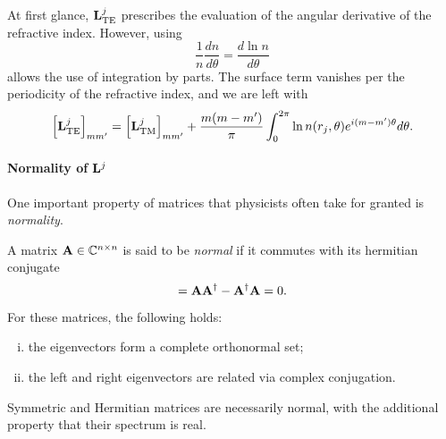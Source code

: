 At first glance, $\mathbf{L}^j_\text{TE}$ prescribes the evaluation of
the angular derivative of the refractive index. However, 
using 
	\begin{equation}
		\frac{1}{n}\frac{dn}{d\theta} = \frac{d\ln n}{d\theta}
	\end{equation}
allows the use of integration by parts. The surface term 
vanishes per the periodicity of the refractive index, and we 
are left with 
	\begin{equation}
		\left[\mathbf{L}^j_\text{TE}\right]_{mm'} = \left[\mathbf{L}^j_\text{TM}\right]_{mm'}
						+\frac{m(m-m')}{\pi}\int_0^{2\pi}\ln n(r_j,\theta) e^{i(m-m')\theta}d\theta.
	\end{equation}

\paragraph{Normality of $\mathbf{L}^j$}
One important property of matrices that physicists often 
take for granted is \textit{normality}.

\begin{defn}
	A matrix $\mathbf{A}\in\mathbb{C}^{n\times n}$ is said to be \textit{normal}
	if it commutes with its hermitian conjugate
		\begin{equation}
			[\mat{A},\mat{A}^\dagger]=\mat{A}\mat{A}^\dagger-\mat{A}^\dagger\mat{A} =0.
		\end{equation}
	For these matrices, the following holds:
		\begin{enumerate}[(i)]
			\item the eigenvectors form a complete orthonormal set; 
			\item the left and right eigenvectors are related via complex conjugation.
		\end{enumerate}
\end{defn}

Symmetric and Hermitian matrices are necessarily normal, with the additional
property that their spectrum is real. 

